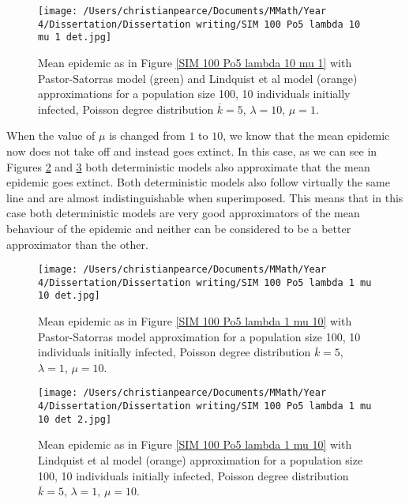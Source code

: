 \documentclass{uonmathsreport}
\begin{document}
\begin{figure}
\begin{center}
\texttt{[image: /Users/christianpearce/Documents/MMath/Year 4/Dissertation/Dissertation writing/SIM 100 Po5 lambda 10 mu 1 det.jpg]}
\end{center}
\caption{Mean epidemic as in Figure \ref{SIM 100 Po5 lambda 10 mu 1} with Pastor-Satorras model (green) and Lindquist et al model (orange) approximations for a population size 100, 10 individuals initially infected, Poisson degree distribution $\overline{k}=5$, $\lambda=10$, $\mu=1$.}
\label{7.3}
\end{figure}

When the value of $\mu$ is changed from $1$ to $10$, we know that the mean epidemic now does not take off and instead goes extinct. In this case, as we can see in Figures \ref{7.4} and \ref{7.5} both deterministic models also approximate that the mean epidemic goes extinct. Both deterministic models also follow virtually the same line and are almost indistinguishable when superimposed. This means that in this case both deterministic models are very good approximators of the mean behaviour of the epidemic and neither can be considered to be a better approximator than the other. 

\begin{figure}
\begin{center}
\texttt{[image: /Users/christianpearce/Documents/MMath/Year 4/Dissertation/Dissertation writing/SIM 100 Po5 lambda 1 mu 10 det.jpg]}
\end{center}
\caption{Mean epidemic as in Figure \ref{SIM 100 Po5 lambda 1 mu 10} with Pastor-Satorras model approximation for a population size 100, 10 individuals initially infected, Poisson degree distribution $\overline{k}=5$, $\lambda=1$, $\mu=10$.}
\label{7.4}
\end{figure}

\begin{figure}
\begin{center}
\texttt{[image: /Users/christianpearce/Documents/MMath/Year 4/Dissertation/Dissertation writing/SIM 100 Po5 lambda 1 mu 10 det 2.jpg]}
\end{center}
\caption{Mean epidemic as in Figure \ref{SIM 100 Po5 lambda 1 mu 10} with Lindquist et al model (orange) approximation for a population size 100, 10 individuals initially infected, Poisson degree distribution $\overline{k}=5$, $\lambda=1$, $\mu=10$.}
\label{7.5}
\end{figure}
\end{document}
